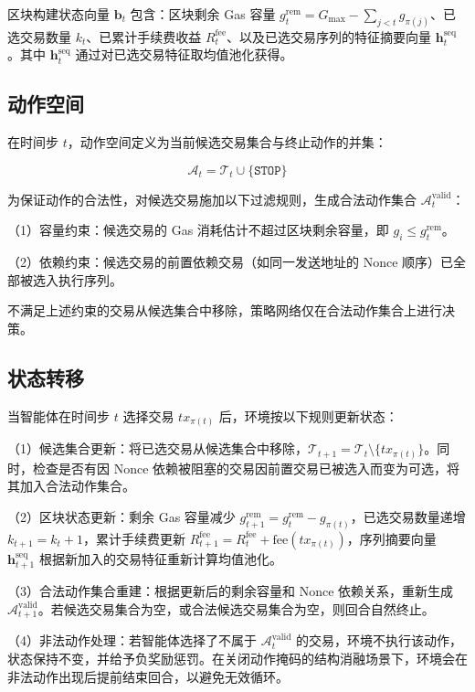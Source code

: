 区块构建状态向量 $\mathbf{b}_t$ 包含：区块剩余 Gas 容量 $g_t^{\text{rem}} = G_{\max} - \sum_{j<t} g_{\pi(j)}$、已选交易数量 $k_t$、已累计手续费收益 $R_t^{\text{fee}}$、以及已选交易序列的特征摘要向量 $\mathbf{h}_t^{\text{seq}}$。其中 $\mathbf{h}_t^{\text{seq}}$ 通过对已选交易特征取均值池化获得。

\subsection{动作空间}

在时间步 $t$，动作空间定义为当前候选交易集合与终止动作的并集：

\begin{equation}
  \mathcal{A}_t = \mathcal{T}_t \cup \{\texttt{STOP}\}
\end{equation}

为保证动作的合法性，对候选交易施加以下过滤规则，生成合法动作集合 $\mathcal{A}_t^{\text{valid}}$：

（1）容量约束：候选交易的 Gas 消耗估计不超过区块剩余容量，即 $g_i \leq g_t^{\text{rem}}$。

（2）依赖约束：候选交易的前置依赖交易（如同一发送地址的 Nonce 顺序）已全部被选入执行序列。

不满足上述约束的交易从候选集合中移除，策略网络仅在合法动作集合上进行决策。

\subsection{状态转移}

当智能体在时间步 $t$ 选择交易 $tx_{\pi(t)}$ 后，环境按以下规则更新状态：

（1）候选集合更新：将已选交易从候选集合中移除，$\mathcal{T}_{t+1} = \mathcal{T}_t \setminus \{tx_{\pi(t)}\}$。同时，检查是否有因 Nonce 依赖被阻塞的交易因前置交易已被选入而变为可选，将其加入合法动作集合。

（2）区块状态更新：剩余 Gas 容量减少 $g_{t+1}^{\text{rem}} = g_t^{\text{rem}} - g_{\pi(t)}$，已选交易数量递增 $k_{t+1} = k_t + 1$，累计手续费更新 $R_{t+1}^{\text{fee}} = R_t^{\text{fee}} + \text{fee}(tx_{\pi(t)})$，序列摘要向量 $\mathbf{h}_{t+1}^{\text{seq}}$ 根据新加入的交易特征重新计算均值池化。

（3）合法动作集合重建：根据更新后的剩余容量和 Nonce 依赖关系，重新生成 $\mathcal{A}_{t+1}^{\text{valid}}$。若候选交易集合为空，或合法候选交易集合为空，则回合自然终止。

（4）非法动作处理：若智能体选择了不属于 $\mathcal{A}_t^{\text{valid}}$ 的交易，环境不执行该动作，状态保持不变，并给予负奖励惩罚。在关闭动作掩码的结构消融场景下，环境会在非法动作出现后提前结束回合，以避免无效循环。


